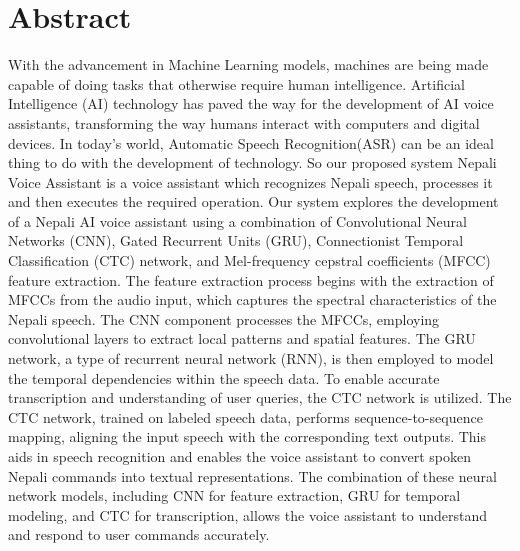 

\KECcoverpage %
\KECtitlepage %




 



\chapter*{Abstract} %
With the advancement in Machine Learning models, machines are being made capable of doing tasks that otherwise require human intelligence. Artificial Intelligence (AI) technology has paved the way for the development of AI voice assistants, transforming the way humans interact with computers and digital devices. In today's world, Automatic Speech Recognition(ASR) can be an ideal thing to do with the development of technology. So our proposed system Nepali Voice Assistant is a voice assistant which recognizes Nepali speech, processes it and then executes the required operation. Our system explores the development of a Nepali AI voice assistant using a combination of Convolutional Neural Networks (CNN), Gated Recurrent Units (GRU), Connectionist Temporal Classification (CTC) network, and Mel-frequency cepstral coefficients (MFCC) feature extraction. The feature extraction process begins with the extraction of MFCCs from the audio input, which captures the spectral characteristics of the Nepali speech. The CNN component processes the MFCCs, employing convolutional layers to extract local patterns and spatial features. The GRU network, a type of recurrent neural network (RNN), is then employed to model the temporal dependencies within the speech data. To enable accurate transcription and understanding of user queries, the CTC network is utilized. The CTC network, trained on labeled speech data, performs sequence-to-sequence mapping, aligning the input speech with the corresponding text outputs. This aids in speech recognition and enables the voice assistant to convert spoken Nepali commands into textual representations. The combination of these neural network models, including CNN for feature extraction, GRU for temporal modeling, and CTC for transcription, allows the voice assistant to understand and respond to user commands accurately.


